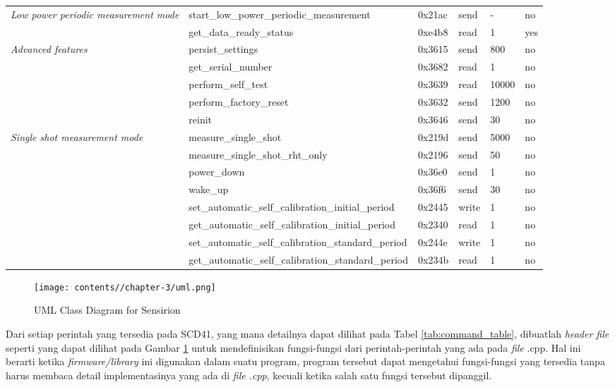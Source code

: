 \begin{landscape}
\begin{longtable}{|p{2cm}|p{8cm}|p{1.5cm}|p{2cm}|p{2cm}|p{2cm}|}
        \textit{Low power periodic measurement mode} & start\_low\_power\_periodic\_measurement & 0x21ac & send & - & no \\
        & get\_data\_ready\_status & 0xe4b8 & read & 1 & yes \\
        \hline
        
        \textit{Advanced features} & persist\_settings & 0x3615 & send & 800 & no \\
        & get\_serial\_number & 0x3682 & read & 1 & no \\
        & perform\_self\_test & 0x3639 & read & 10000 & no \\
        & perform\_factory\_reset & 0x3632 & send & 1200 & no \\
        & reinit & 0x3646 & send & 30 & no \\
        \hline
        
        \textit{Single shot measurement mode} & measure\_single\_shot & 0x219d & send & 5000 & no \\
        & measure\_single\_shot\_rht\_only & 0x2196 & send & 50 & no \\
        & power\_down & 0x36e0 & send & 1 & no \\
        & wake\_up & 0x36f6 & send & 30 & no \\
        & set\_automatic\_self\_calibration\_initial\_period & 0x2445 & write & 1 & no \\
        & get\_automatic\_self\_calibration\_initial\_period & 0x2340 & read & 1 & no \\
        & set\_automatic\_self\_calibration\_standard\_period & 0x244e & write & 1 & no \\
        & get\_automatic\_self\_calibration\_standard\_period & 0x234b & read & 1 & no \\
        \hline
        
        \end{longtable}
        \end{landscape}
        
        \begin{figure}[H]
            \centering
            \texttt{[image: contents//chapter-3/uml.png]}
            \caption{UML Class Diagram for Sensirion}
            \label{fig:uml}
        \end{figure}

        Dari setiap perintah yang tersedia pada SCD41, yang mana detailnya dapat dilihat pada Tabel \ref{tab:command_table}, dibuatlah \textit{header file} seperti yang dapat dilihat pada Gambar \ref{fig:uml} untuk mendefinisikan fungsi-fungsi dari perintah-perintah yang ada pada \textit{file} .cpp. Hal ini berarti ketika \textit{firmware/library} ini digunakan dalam suatu program, program tersebut dapat mengetahui fungsi-fungsi yang tersedia tanpa harus membaca detail implementasinya yang ada di \textit{file .cpp}, kecuali ketika salah satu fungsi tersebut dipanggil.

